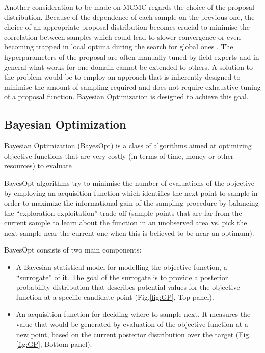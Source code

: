 \documentclass[bsc,frontabs,singlespacing,parskip,deptreport]{infthesis}
\begin{document}
Another consideration to be made on MCMC regards the choice of the proposal distribution. Because of the dependence of each sample on the previous one, the choice of an appropriate proposal distribution becomes crucial to minimise the correlation between samples which could lead to slower convergence or even becoming trapped in local optima during the search for global ones \cite{rosenthal2011optimal}. The hyperparameters of the proposal are often manually tuned by field experts and in general what works for one domain cannot be extended to others. A solution to the problem would be to employ an approach that is inherently designed to minimise the amount of sampling required and does not require exhaustive tuning of a proposal function. Bayesian Optimization is designed to achieve this goal.






\subsection{Bayesian Optimization}\label{sec:BO_theory}


Bayesian Optimization (BayesOpt) is a class of algorithms aimed at optimizing objective functions that are very costly (in terms of time, money or other resources) to evaluate \cite{Jones1998EfficientGO}.

BayesOpt algorithms try to minimise the number of evaluations of the objective by employing an acquisition function which identifies the next point to sample in order to maximize the informational gain of the sampling  procedure by balancing the “exploration-exploitation” trade-off (sample points that are far from the current sample to learn about the function in an unobserved area vs. pick the next sample near the current one when this is believed to be near an optimum).

BayesOpt consists of two main components:
\begin{itemize}
    \item A Bayesian statistical model for modelling the objective function, a “surrogate” of it. The goal of the surrogate is to provide a posterior probability distribution that describes potential values for the objective function at a specific candidate point (Fig.\ref{fig:GP}, Top panel).
    \item An acquisition function for deciding where to sample next. It measures the value that would be generated by evaluation of the objective function at a new point, based on the current posterior distribution over the target (Fig.\ref{fig:GP}, Bottom panel).
\end{itemize}
\end{document}

